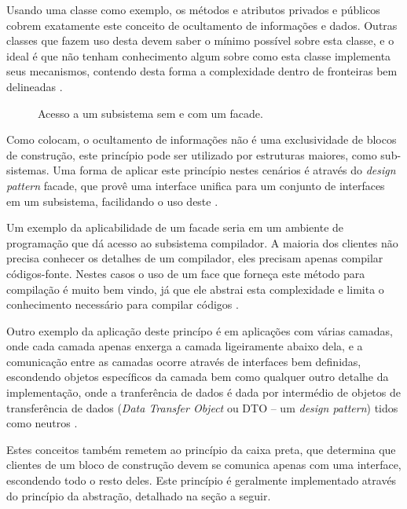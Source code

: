 \documentclass[diss]{template/setrem}
\begin{document}
Usando uma classe como exemplo, os métodos e atributos privados e públicos cobrem exatamente este conceito de ocultamento de informações e dados. Outras classes que fazem uso desta devem saber o mínimo possível sobre esta classe, e o ideal é que não tenham conhecimento algum sobre como esta classe implementa seus mecanismos, contendo desta forma a complexidade dentro de fronteiras bem delineadas \citep{Vogel2011}.

\begin{figure}[!h]
    \caption{Acesso a um subsistema sem e com um facade.}
    \label{fig:facade}
\end{figure}

Como \citet{Vogel2011} colocam, o ocultamento de informações não é uma exclusividade de blocos de construção, este princípio pode ser utilizado por estruturas maiores, como sub-sistemas. Uma forma de aplicar este princípio nestes cenários é através do \emph{design pattern} facade, que provê uma interface unifica para um conjunto de interfaces em um subsistema, facilidando o uso deste \citep{Gamma1998}.

Um exemplo da aplicabilidade de um facade seria em um ambiente de programação que dá acesso ao subsistema compilador. A maioria dos clientes não precisa conhecer os detalhes de um compilador, eles precisam apenas compilar códigos-fonte. Nestes casos o uso de um face que forneça este método para compilação é muito bem vindo, já que ele abstrai esta complexidade e limita o conhecimento necessário para compilar códigos \citep{Gamma1998}.

Outro exemplo da aplicação deste princípo é em aplicações com várias camadas, onde cada camada apenas enxerga a camada ligeiramente abaixo dela, e a comunicação entre as camadas ocorre através de interfaces bem definidas, escondendo objetos específicos da camada bem como qualquer outro detalhe da implementação, onde a tranferência de dados é dada por intermédio de objetos de transferência de dados (\emph{Data Transfer Object} ou DTO -- um \emph{design pattern}) tidos como neutros \citep{Vogel2011}.

Estes conceitos também remetem ao princípio da caixa preta, que determina que clientes de um bloco de construção devem se comunica apenas com uma interface, escondendo todo o resto deles. Este princípio é geralmente implementado através do princípio da abstração, detalhado na seção a seguir.
\end{document}
